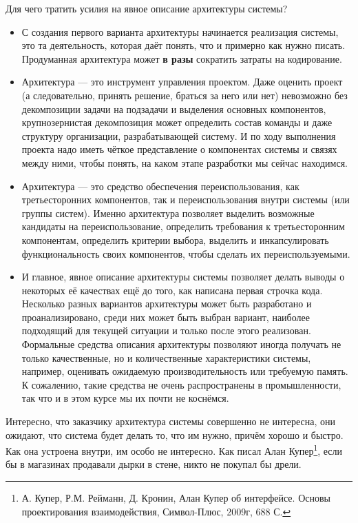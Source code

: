 \documentclass{../../text-style}
\begin{document}
Для чего тратить усилия на явное описание архитектуры системы?
\begin{itemize}
    \item С создания первого варианта архитектуры начинается реализация системы, это та деятельность, которая даёт понять, что и примерно как нужно писать. Продуманная архитектура может \textbf{в разы} сократить затраты на кодирование.
    \item Архитектура --- это инструмент управления проектом. Даже оценить проект (а следовательно, принять решение, браться за него или нет) невозможно без декомпозиции задачи на подзадачи и выделения основных компонентов, крупнозернистая декомпозиция может определить состав команды и даже структуру организации, разрабатывающей систему. И по ходу выполнения проекта надо иметь чёткое представление о компонентах системы и связях между ними, чтобы понять, на каком этапе разработки мы сейчас находимся.
    \item Архитектура --- это средство обеспечения переиспользования, как третьесторонних компонентов, так и переиспользования внутри системы (или группы систем). Именно архитектура позволяет выделить возможные кандидаты на переиспользование, определить требования к третьесторонним компонентам, определить критерии выбора, выделить и инкапсулировать функциональность своих компонентов, чтобы сделать их переиспользуемыми.
    \item И главное, явное описание архитектуры системы позволяет делать выводы о некоторых её качествах ещё до того, как написана первая строчка кода. Несколько разных вариантов архитектуры может быть разработано и проанализировано, среди них может быть выбран вариант, наиболее подходящий для текущей ситуации и только после этого реализован. Формальные средства описания архитектуры позволяют иногда получать не только качественные, но и количественные характеристики системы, например, оценивать ожидаемую производительность или требуемую память. К сожалению, такие средства не очень распространены в промышленности, так что и в этом курсе мы их почти не коснёмся.
\end{itemize}

Интересно, что заказчику архитектура системы совершенно не интересна, они ожидают, что система будет делать то, что им нужно, причём хорошо и быстро. Как она устроена внутри, им особо не интересно. Как писал Алан Купер\footnote{А. Купер, Р.М. Рейманн, Д. Кронин, Алан Купер об интерфейсе. Основы проектирования взаимодействия, Символ-Плюс, 2009г, 688 С.}, если бы в магазинах продавали дырки в стене, никто не покупал бы дрели.
\end{document}
